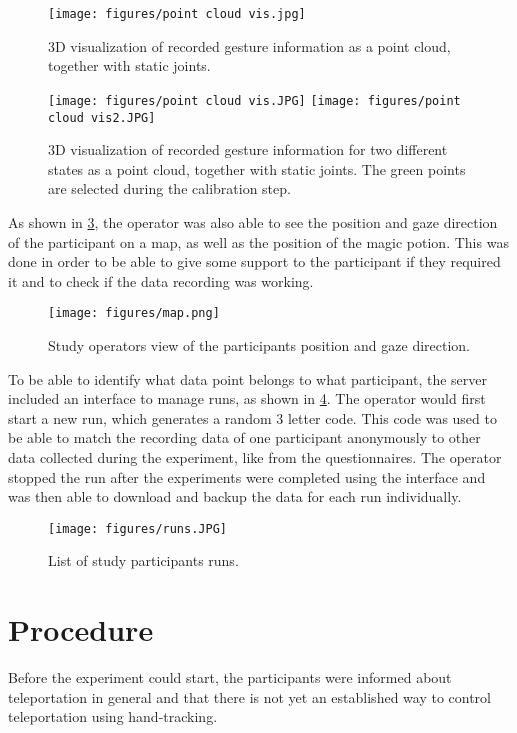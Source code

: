 \begin{figure}[!ht]
    \centering
    \texttt{[image: figures/point cloud vis.jpg]}
    \caption{3D visualization of recorded gesture information as a point cloud, together with static joints.}
    \label{fig:vis}
\end{figure}
\begin{figure}[!htb]
        \texttt{[image: figures/point cloud vis.JPG]}
    \endminipage\hfill
        \texttt{[image: figures/point cloud vis2.JPG]}
        \label{fig:vis}
    \endminipage\hfill
    \caption{3D visualization of recorded gesture information for two different states as a point cloud, together with static joints. The green points are selected during the calibration step.}
\end{figure}

As shown in \ref{fig:map}, the operator was also able to see the position and gaze direction of the participant on a map, as well as the position of the magic potion. This was done in order to be able to give some support to the participant if they required it and to check if the data recording was working. 

\begin{figure}[!ht]
    \centering
    \texttt{[image: figures/map.png]}
    \caption{Study operators view of the participants position and gaze direction.}
    \label{fig:map}
\end{figure}

To be able to identify what data point belongs to what participant, the server included an interface to manage runs, as shown in \ref{fig:runs}. The operator would first start a new run, which generates a random 3 letter code. This code was used to be able to match the recording data of one participant anonymously to other data collected during the experiment, like from the questionnaires. The operator stopped the run after the experiments were completed using the interface and was then able to download and backup the data for each run individually.

\begin{figure}[!ht]
    \centering
    \texttt{[image: figures/runs.JPG]}
    \caption{List of study participants runs.}
    \label{fig:runs}
\end{figure}

\section{Procedure}
Before the experiment could start, the participants were informed about teleportation in general and that there is not yet an established way to control teleportation using hand-tracking.

